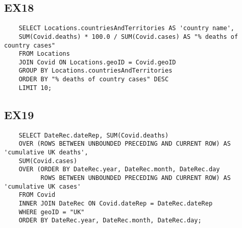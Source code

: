\documentclass{report}
\begin{document}
\subsection*{EX18}
\begin{verbatim}
    SELECT Locations.countriesAndTerritories AS 'country name',
    SUM(Covid.deaths) * 100.0 / SUM(Covid.cases) AS "% deaths of country cases"
    FROM Locations 
    JOIN Covid ON Locations.geoID = Covid.geoID
    GROUP BY Locations.countriesAndTerritories
    ORDER BY "% deaths of country cases" DESC
    LIMIT 10;
\end{verbatim}

\subsection*{EX19}
\begin{verbatim}
    SELECT DateRec.dateRep, SUM(Covid.deaths) 
    OVER (ROWS BETWEEN UNBOUNDED PRECEDING AND CURRENT ROW) AS 'cumulative UK deaths',
    SUM(Covid.cases) 
    OVER (ORDER BY DateRec.year, DateRec.month, DateRec.day 
          ROWS BETWEEN UNBOUNDED PRECEDING AND CURRENT ROW) AS 'cumulative UK cases'
    FROM Covid 
    INNER JOIN DateRec ON Covid.dateRep = DateRec.dateRep
    WHERE geoID = "UK"
    ORDER BY DateRec.year, DateRec.month, DateRec.day;
\end{verbatim}
\end{document}
